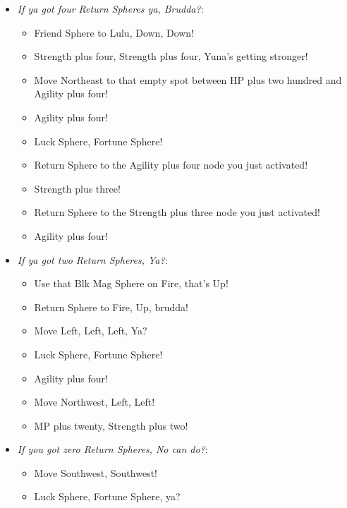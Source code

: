 \begin{spheregrid}
\begin{itemize}
\yunaf
\begin{itemize}
\item \textit{If ya got four Return Spheres ya, Brudda?}:
\begin{itemize}
\item Friend Sphere to Lulu, Down, Down!
\item Strength plus four, Strength plus four, Yuna's getting stronger!
\item Move Northeast to that empty spot between HP plus two hundred and Agility plus four!
\item Agility plus four!
\item Luck Sphere, Fortune Sphere!
\item Return Sphere to the Agility plus four node you just activated!
\item Strength plus three!
\item Return Sphere to the Strength plus three node you just activated!
\item Agility plus four!
\end{itemize}
\item \textit{If ya got two Return Spheres, Ya?}:
\begin{itemize}
\item Use that Blk Mag Sphere on Fire, that's Up!
\item Return Sphere to Fire, Up, brudda!
\item Move Left, Left, Left, Ya?
\item Luck Sphere, Fortune Sphere!
\item Agility plus four!
\item Move Northwest, Left, Left!
\item MP plus twenty, Strength plus two!
\end{itemize}
\item \textit{If you got zero Return Spheres, No can do?}:
\begin{itemize}
\item Move Southwest, Southwest!
\item Luck Sphere, Fortune Sphere, ya?
\end{itemize}
\end{itemize}
\end{itemize}
\end{spheregrid}
